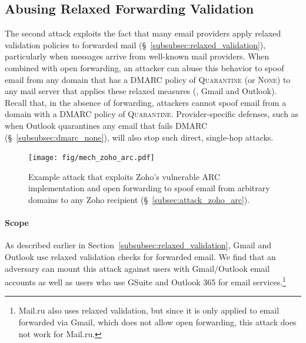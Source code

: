 \subsection{Abusing Relaxed Forwarding Validation}
\label{subsec:attack_relaxed_forwarding_validation}

The second attack exploits the fact that many email providers apply relaxed validation policies to forwarded mail (\S~\ref{subsubsec:relaxed_validation}), particularly when messages arrive from well-known mail providers.
When combined with open forwarding, an attacker can abuse this behavior
to spoof email from any domain that has a DMARC policy of
\textsc{Quarantine} (or \textsc{None}) to any mail server that applies these relaxed measures (\eg, Gmail and Outlook).  Recall that, in the absence of forwarding, attackers cannot spoof email from a domain with a DMARC policy of \textsc{Quarantine}.
Provider-specific defenses, such as when Outlook quarantines any email that fails DMARC (\S~\ref{subsubsec:dmarc_none}), will also stop such direct, single-hop attacks.

\begin{figure}[t]
\centerline{\texttt{[image: fig/mech\_zoho\_arc.pdf]}}
\centering
\caption{Example attack that exploits Zoho's
vulnerable ARC implementation and  open forwarding to
  spoof email from arbitrary domains to any Zoho recipient (\S~\ref{subsec:attack_zoho_arc}).}
\label{fig:mech_zoho_arc}
\end{figure}

\paragraph{Scope}
As described earlier in Section~\ref{subsubsec:relaxed_validation}, Gmail and Outlook use relaxed validation checks for forwarded email.
We find that an adversary can mount this attack against users with
Gmail/Outlook email accounts as well as users who use GSuite and Outlook 365 for email services.\footnote{Mail.ru also uses relaxed validation, but since it is only applied to email forwarded via Gmail, which does not allow open forwarding, this attack does not work for Mail.ru.}

